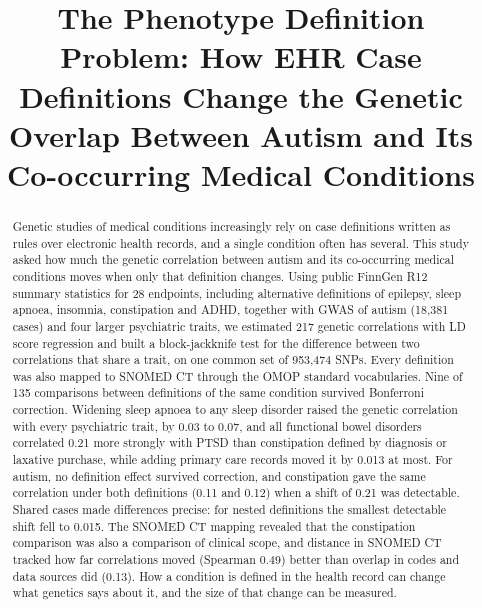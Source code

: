 \documentclass[conference]{IEEEtran}
\begin{document}
\title{The Phenotype Definition Problem: How EHR Case Definitions Change the Genetic Overlap Between Autism and Its Co-occurring Medical Conditions}

\author{
\vspace{12.8pt}
}

\maketitle

\begin{abstract}
Genetic studies of medical conditions increasingly rely on case definitions written as rules over electronic health records, and a single condition often has several. This study asked how much the genetic correlation between autism and its co-occurring medical conditions moves when only that definition changes. Using public FinnGen R12 summary statistics for 28 endpoints, including alternative definitions of epilepsy, sleep apnoea, insomnia, constipation and ADHD, together with GWAS of autism (18,381 cases) and four larger psychiatric traits, we estimated 217 genetic correlations with LD score regression and built a block-jackknife test for the difference between two correlations that share a trait, on one common set of 953,474 SNPs. Every definition was also mapped to SNOMED CT through the OMOP standard vocabularies. Nine of 135 comparisons between definitions of the same condition survived Bonferroni correction. Widening sleep apnoea to any sleep disorder raised the genetic correlation with every psychiatric trait, by 0.03 to 0.07, and all functional bowel disorders correlated 0.21 more strongly with PTSD than constipation defined by diagnosis or laxative purchase, while adding primary care records moved it by 0.013 at most. For autism, no definition effect survived correction, and constipation gave the same correlation under both definitions (0.11 and 0.12) when a shift of 0.21 was detectable. Shared cases made differences precise: for nested definitions the smallest detectable shift fell to 0.015. The SNOMED CT mapping revealed that the constipation comparison was also a comparison of clinical scope, and distance in SNOMED CT tracked how far correlations moved (Spearman 0.49) better than overlap in codes and data sources did (0.13). How a condition is defined in the health record can change what genetics says about it, and the size of that change can be measured.
\end{abstract}
\end{document}
